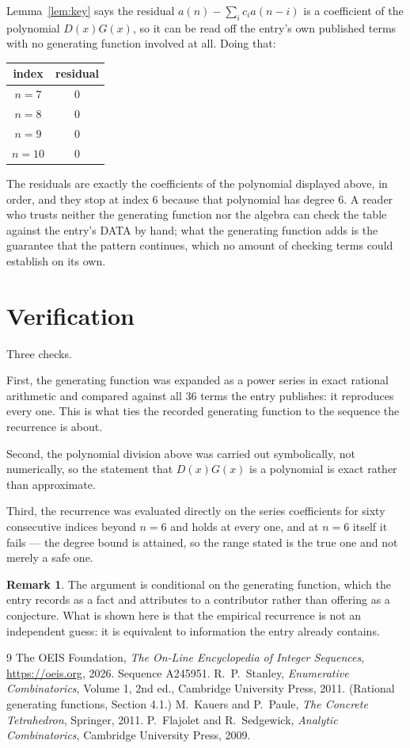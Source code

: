 \documentclass[11pt,a4paper]{article}
\theoremstyle{plain}
\theoremstyle{definition}
\newtheorem{remark}[theorem]{Remark}
\begin{document}
Lemma~\ref{lem:key} says the residual $a(n)-\sum_ic_ia(n-i)$ is a coefficient of the
polynomial $D(x)G(x)$, so it can be read off the entry's own published terms with no
generating function involved at all. Doing that:
\begin{center}
\begin{tabular}{cc}
index & residual \\ \hline
$n=7$ & $0$ \\
$n=8$ & $0$ \\
$n=9$ & $0$ \\
$n=10$ & $0$
\end{tabular}
\end{center}
The residuals are exactly the coefficients of the polynomial displayed above, in order, and
they stop at index $6$ because that polynomial has degree $6$. A reader who trusts
neither the generating function nor the algebra can check the table against the entry's DATA
by hand; what the generating function adds is the guarantee that the pattern continues, which
no amount of checking terms could establish on its own.

\section{Verification}

Three checks.

First, the generating function was expanded as a power series in exact rational arithmetic and
compared against all $36$ terms the entry publishes: it reproduces every one. This is
what ties the recorded generating function to the sequence the recurrence is about.

Second, the polynomial division above was carried out symbolically, not numerically, so the
statement that $D(x)G(x)$ is a polynomial is exact rather than approximate.

Third, the recurrence was evaluated directly on the series coefficients for sixty consecutive
indices beyond $n=6$ and holds at every one, and at $n=6$ itself it fails --- the
degree bound is attained, so the range stated is the true one and not merely a safe one.

\begin{remark}
The argument is conditional on the generating function, which the entry records as a fact and
attributes to a contributor rather than offering as a conjecture. What is shown here is that
the empirical recurrence is not an independent guess: it is equivalent to information the
entry already contains.
\end{remark}

\begin{thebibliography}{9}
 The OEIS Foundation, \emph{The On-Line Encyclopedia of Integer
Sequences}, \url{https://oeis.org}, 2026. Sequence A245951.
 R.~P.~Stanley, \emph{Enumerative Combinatorics}, Volume 1, 2nd ed.,
Cambridge University Press, 2011. (Rational generating functions, Section 4.1.)
 M.~Kauers and P.~Paule, \emph{The Concrete Tetrahedron}, Springer, 2011.
 P.~Flajolet and R.~Sedgewick, \emph{Analytic Combinatorics}, Cambridge
University Press, 2009.
\end{thebibliography}
\end{document}
